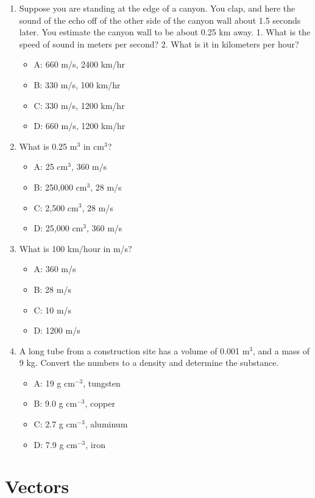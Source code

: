 \documentclass[10pt]{article}
\begin{document}
\begin{enumerate}
\item Suppose you are standing at the edge of a canyon.  You clap, and here the sound of the echo off of the other side of the canyon wall about 1.5 seconds later.  You estimate the canyon wall to be about 0.25 km away.  1. What is the speed of sound in meters per second?  2. What is it in kilometers per hour?
\begin{itemize}
\item A: 660 m/s, 2400 km/hr
\item B: 330 m/s, 100 km/hr
\item C: 330 m/s, 1200 km/hr
\item D: 660 m/s, 1200 km/hr
\end{itemize}
\item What is 0.25 m$^3$ in cm$^3$?
\begin{itemize}
\item A: 25 cm$^3$, 360 m/s
\item B: 250,000 cm$^3$, 28 m/s
\item C: 2,500 cm$^3$, 28 m/s
\item D: 25,000 cm$^3$, 360 m/s
\end{itemize}
\item What is 100 km/hour in m/s?
\begin{itemize}
\item A: 360 m/s
\item B: 28 m/s
\item C: 10 m/s
\item D: 1200 m/s
\end{itemize}
\item A long tube from a construction site has a volume of 0.001 m$^3$, and a mass of 9 kg.  Convert the numbers to a density and determine the substance.
\begin{itemize}
\item A: 19 g cm$^{-3}$, tungsten
\item B: 9.0 g cm$^{-3}$, copper
\item C: 2.7 g cm$^{-3}$, aluminum
\item D: 7.9 g cm$^{-3}$, iron
\end{itemize}
\end{enumerate}

\section{Vectors}
\end{document}
